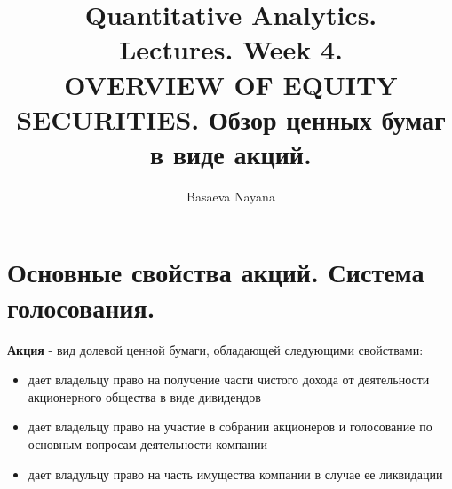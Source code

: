\documentclass{article}
\title{Quantitative Analytics.\\
Lectures. Week 4. \\
OVERVIEW OF EQUITY SECURITIES. Обзор ценных бумаг в виде акций.}
\author{Basaeva Nayana}
\begin{document}
\maketitle

\setcounter{tocdepth}{1} %
\renewcommand\contentsname{Оглавление}
\tableofcontents
\newpage




\renewcommand{\labelitemi}{\tiny$\bullet$}
\renewcommand{\figurename}{Fig.}

 \section{Основные свойства акций. Система голосования.}
     \textbf{Акция} - вид долевой ценной бумаги, обладающей следующими свойствами:
     
\begin{itemize}
     \item дает владельцу право на получение части чистого дохода от деятельности акционерного общества в виде дивидендов

     \item дает владельцу право на участие в собрании акционеров и голосование по основным вопросам деятельности компании

     \item дает владульцу право на часть имущества компании в случае ее ликвидации
     \end{itemize}
     
\end{document}
